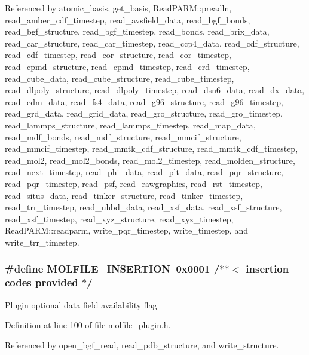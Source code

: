Referenced by atomic\_\-basis, get\_\-basis, Read\-PARM::preadln, read\_\-amber\_\-cdf\_\-timestep, read\_\-avsfield\_\-data, read\_\-bgf\_\-bonds, read\_\-bgf\_\-structure, read\_\-bgf\_\-timestep, read\_\-bonds, read\_\-brix\_\-data, read\_\-car\_\-structure, read\_\-car\_\-timestep, read\_\-ccp4\_\-data, read\_\-cdf\_\-structure, read\_\-cdf\_\-timestep, read\_\-cor\_\-structure, read\_\-cor\_\-timestep, read\_\-cpmd\_\-structure, read\_\-cpmd\_\-timestep, read\_\-crd\_\-timestep, read\_\-cube\_\-data, read\_\-cube\_\-structure, read\_\-cube\_\-timestep, read\_\-dlpoly\_\-structure, read\_\-dlpoly\_\-timestep, read\_\-dsn6\_\-data, read\_\-dx\_\-data, read\_\-edm\_\-data, read\_\-fs4\_\-data, read\_\-g96\_\-structure, read\_\-g96\_\-timestep, read\_\-grd\_\-data, read\_\-grid\_\-data, read\_\-gro\_\-structure, read\_\-gro\_\-timestep, read\_\-lammps\_\-structure, read\_\-lammps\_\-timestep, read\_\-map\_\-data, read\_\-mdf\_\-bonds, read\_\-mdf\_\-structure, read\_\-mmcif\_\-structure, read\_\-mmcif\_\-timestep, read\_\-mmtk\_\-cdf\_\-structure, read\_\-mmtk\_\-cdf\_\-timestep, read\_\-mol2, read\_\-mol2\_\-bonds, read\_\-mol2\_\-timestep, read\_\-molden\_\-structure, read\_\-next\_\-timestep, read\_\-phi\_\-data, read\_\-plt\_\-data, read\_\-pqr\_\-structure, read\_\-pqr\_\-timestep, read\_\-psf, read\_\-rawgraphics, read\_\-rst\_\-timestep, read\_\-situs\_\-data, read\_\-tinker\_\-structure, read\_\-tinker\_\-timestep, read\_\-trr\_\-timestep, read\_\-uhbd\_\-data, read\_\-xsf\_\-data, read\_\-xsf\_\-structure, read\_\-xsf\_\-timestep, read\_\-xyz\_\-structure, read\_\-xyz\_\-timestep, Read\-PARM::readparm, write\_\-pqr\_\-timestep, write\_\-timestep, and write\_\-trr\_\-timestep.
\subsubsection{\setlength{\rightskip}{0pt plus 5cm}\#define MOLFILE\_\-INSERTION\ 0x0001 /$\ast$$\ast$$<$ insertion codes provided         $\ast$/}\label{molfile__plugin_8h_a9}


Plugin optional data field availability flag 

Definition at line 100 of file molfile\_\-plugin.h.

Referenced by open\_\-bgf\_\-read, read\_\-pdb\_\-structure, and write\_\-structure.
